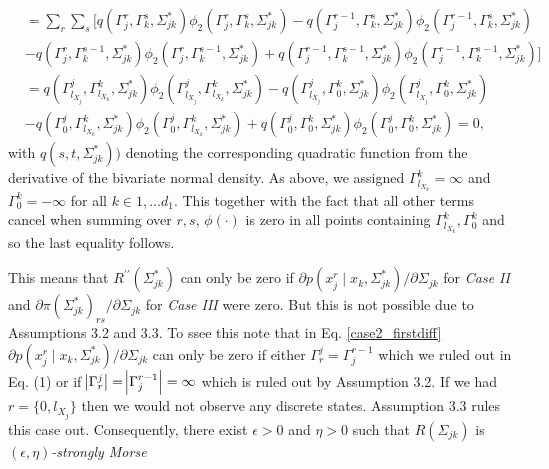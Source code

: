 \begin{condition}
\begin{condition}
\begin{equation*}
\begin{split}
                &= \sum_r\sum_s \Big[q(\Gamma_j^r, \Gamma_k^s, \Sigma_{jk}^*)\phi_2(\Gamma_j^r, \Gamma_k^s, \Sigma_{jk}^*) - q(\Gamma_j^{r-1}, \Gamma_k^s, \Sigma_{jk}^*)\phi_2(\Gamma_j^{r-1}, \Gamma_k^s, \Sigma_{jk}^*) \\
                &- q(\Gamma_j^r, \Gamma_k^{s-1}, \Sigma_{jk}^*)\phi_2(\Gamma_j^r, \Gamma_k^{s-1}, \Sigma_{jk}^*) + q(\Gamma_j^{r-1}, \Gamma_k^{s-1}, \Sigma_{jk}^*)\phi_2(\Gamma_j^{r-1}, \Gamma_k^{s-1}, \Sigma_{jk}^*)\Big] \\
                &= q(\Gamma^j_{l_{X_j}}, \Gamma^k_{l_{X_k}}, \Sigma_{jk}^*)\phi_2(\Gamma^j_{l_{X_j}}, \Gamma^k_{l_{X_k}}, \Sigma_{jk}^*) - q(\Gamma^j_{l_{X_j}}, \Gamma^k_0, \Sigma_{jk}^*)\phi_2(\Gamma^j_{l_{X_j}}, \Gamma^k_0, \Sigma_{jk}^*) \\
                &- q(\Gamma^j_0, \Gamma^k_{l_{X_k}}, \Sigma_{jk}^*)\phi_2(\Gamma^j_0, \Gamma^k_{l_{X_k}}, \Sigma_{jk}^*) + q(\Gamma^j_0, \Gamma^k_0, \Sigma_{jk}^*)\phi_2(\Gamma^j_0, \Gamma^k_0, \Sigma_{jk}^*) = 0,
            \end{split}
        \end{equation*}
        with $q(s,t,\Sigma_{jk}^*))$ denoting the corresponding quadratic function from the derivative of the bivariate normal density. As above, we assigned $\Gamma^k_{l_{X_k}} = \infty$ and $\Gamma^k_0 = -\infty$ for all $k \in 1, \dots d_1$. This together with the fact that all other terms cancel when summing over $r,s$, $\phi(\cdot)$ is zero in all points containing $\Gamma^k_{l_{X_k}}, \Gamma^k_0$ and so the last equality follows.  
        
        This means that $R^{\prime\prime}(\Sigma_{jk}^*)$ can only be zero if $\partial p(x_j^{r} \mid x_{k}, \Sigma_{jk}^*) / \partial \Sigma_{jk}$ for \textit{Case II} and $\partial \pi(\Sigma_{jk}^*)_{rs}/\partial \Sigma_{jk}$ for \textit{Case III} were zero. But this is not possible due to Assumptions 3.2 and 3.3.
        To ssee this note that in Eq. \eqref{case2_firstdiff} $\partial p(x_j^{r} \mid x_{k}, \Sigma_{jk}^*) / \partial \Sigma_{jk}$ can only be zero if either ${\Gamma}_r^j = {\Gamma}^{r-1}_j$ which we ruled out in Eq. (1) 
        or if $\abs{{\Gamma}_r^j} = \abs{{\Gamma}^{r-1}_j} = \infty$ which is ruled out by Assumption 3.2.
        If we had $r=\{0,l_{X_j}\}$ then we would not observe any discrete states. Assumption 3.3 
        rules this case out.
        Consequently, there exist $\epsilon > 0$ and $\eta > 0$ such that $R(\Sigma_{jk})$ is $(\epsilon,\eta)$\textit{-strongly Morse}
    \end{condition}
\end{condition}

